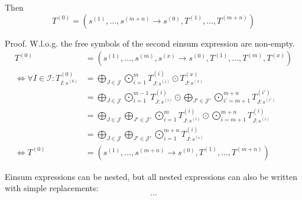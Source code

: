 Then
$$T^{(0)} = (s^{(1)}, \dots, s^{(m + n)} \rightarrow s^{(0)}, T^{(1)}, \dots, T^{(m + n)})$$

Proof. W.l.o.g. the free symbols of the second einsum expression are non-empty.
\begin{align*}
    T^{(0)}                                              & = (s^{(1)},\dots,s^{(m)}, s^{(x)} \rightarrow s^{(0)}, T^{(1)},\dots,T^{(m)}, T^{(x)})                                                                                                             \\
    \iff \forall I \in \mathcal{I}: T^{(0)}_{I: s^{(0)}} & = \bigoplus\limits_{J \in \mathcal{J}} \bigodot\limits_{i = 1}^{m} T^{(i)}_{J:s^{(i)}} \odot T^{(x)}_{J:s^{(x)}}                                                                                   \\
                                                         & = \bigoplus\limits_{J \in \mathcal{J}} \bigodot\limits_{i = 1}^{m - 1} T^{(i)}_{J:s^{(i)}} \odot \bigoplus\limits_{J' \in \mathcal{J}'} \bigodot\limits_{i' = m + 1}^{m + n} T^{(i')}_{J:s^{(i')}} \\
                                                         & = \bigoplus\limits_{J \in \mathcal{J}} \bigoplus\limits_{J' \in \mathcal{J}'} \bigodot\limits_{i = 1}^{m} T^{(i)}_{J:s^{(i)}} \odot \bigodot\limits_{i = m + 1}^{m + n} T^{(i)}_{J:s^{(i)}}        \\
                                                         & = \bigoplus\limits_{J \in \mathcal{J}} \bigoplus\limits_{J' \in \mathcal{J}'} \bigodot\limits_{i = 1}^{m + n} T^{(i)}_{J:s^{(i)}}                                                                  \\
    \iff T^{(0)}                                         & = (s^{(1)}, \dots, s^{(m + n)} \rightarrow s^{(0)}, T^{(1)}, \dots, T^{(m + n)})
\end{align*}


Einsum expressions can be nested, but all nested expressions can also be written with simple replacements:
$$\dots$$